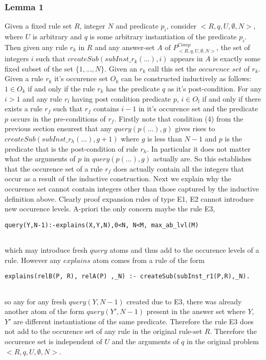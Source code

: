 \documentclass{article}
\begin{document}
\subsubsection{Lemma 1}
Given a fixed rule set $R$, integer $N$ and predicate $p_{i}$, consider $<R,q,U,\emptyset,N>$, where $U$ is arbitrary and $q$ is some arbitrary instantiation of the predicate $p_{i}$. Then given any rule $r_{k}$ in $R$ and any answer-set $A$ of $P_{<R,q,U,\emptyset,N>}^{Comp}$, the set of integers $i$ such that $createSub(subInst\_r_{k}(...),i)$ appears in $A$ is exactly some fixed subset of the set $\{1,...,N\}$. Given an $r_{k}$ call this set the $\textit{occurence set}$ of $r_{k}$. Given a rule $r_{k}$ it's occurence set $O_{k}$ can be constructed inductively as follows:\\
$1 \in O_{k}$ if and only if the rule $r_{k}$ has the predicate $q$ as it's post-condition. For any $i>1$ and any rule $r_{l}$ having post condition predicate $p$, $i\in O_{l}$ if and only if there exists a rule $r_{f}$ such that $r_{f}$ contains $i-1$ in it's occurence set and the predicate $p$ occurs in the pre-conditions of $r_{f}$. Firstly note that condition (4) from the previous section ensurest that any $query(p(...),g)$ gives rises to $createSub(subInst\_r_{h}(...),g+1)$ where $g$ is less than $N-1$ and $p$ is the predicate that is the post-condition of rule $r_{h}$. In particular it does not matter what the arguments of $p$ in $query(p(...),g)$ actually are. So this establishes that the occurence set of a rule $r_{f}$ does actually contain all the integers that occur as a result of the inductive construction. Next we explain why the occurence set cannot contain integers other than those captured by the inductive definition above. Clearly proof expansion rules of type E1, E2 cannot introduce new occurence levels. A-priori the only concern maybe the rule E3,\begin{verbatim}
query(Y,N-1):-explains(X,Y,N),0<N, N<M, max_ab_lvl(M)
    
\end{verbatim} which may introduce fresh $query$ atoms and thus add to the occurence levels of a rule. However any $explains$ atom comes from a rule of the form \begin{verbatim}
explains(relB(P, R), relA(P) ,_N) :- createSub(subInst_r1(P,R),_N).
    
\end{verbatim} so any for any fresh $query(Y,N-1)$ created due to E3, there was already another atom of the form $query(Y',N-1)$ present in the answer set where $Y$, $Y'$ are different instantiations of the same predicate. Therefore the rule E3 does not add to the occurence set of any rule in the original rule-set $R$. Therefore the occurence set is independent of $U$ and the arguments of $q$ in the original problem $<R,q,U,\emptyset,N>$.
\end{document}
